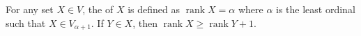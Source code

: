 For any set $X \in V$, the  of $X$ is defined as $\operatorname{rank} X = \alpha$ where $\alpha$ is the least ordinal such that $X \in V_{\alpha+1}$. If $Y \in X$, then $\operatorname{rank} X \geqslant \operatorname{rank} Y + 1$.
